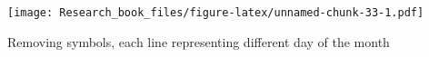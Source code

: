 \documentclass[]{book}
\newenvironment{Shaded}{\begin{snugshade}}{\end{snugshade}}
\newcommand{\KeywordTok}[1]{\textcolor[rgb]{0.13,0.29,0.53}{\textbf{#1}}}
\newcommand{\DataTypeTok}[1]{\textcolor[rgb]{0.13,0.29,0.53}{#1}}
\newcommand{\DecValTok}[1]{\textcolor[rgb]{0.00,0.00,0.81}{#1}}
\newcommand{\StringTok}[1]{\textcolor[rgb]{0.31,0.60,0.02}{#1}}
\newcommand{\OperatorTok}[1]{\textcolor[rgb]{0.81,0.36,0.00}{\textbf{#1}}}
\newcommand{\NormalTok}[1]{#1}
\theoremstyle{definition}
\theoremstyle{definition}
\theoremstyle{definition}
\theoremstyle{remark}
\begin{document}
\begin{Shaded}
\end{Shaded}

\texttt{[image: Research\_book\_files/figure-latex/unnamed-chunk-33-1.pdf]}

Removing symbols, each line representing different day of the month
\end{document}
